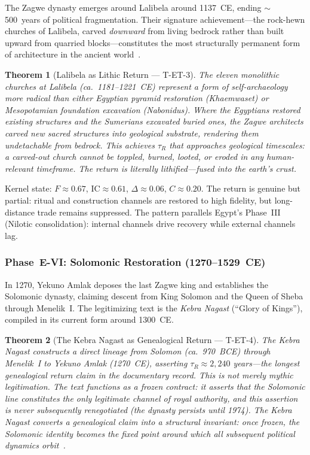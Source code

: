 \documentclass[
  aps,
  prd,
  twocolumn,
  superscriptaddress,
  nofootinbib,
  floatfix
]{revtex4-2}
\newtheorem{theorem}{Theorem}
\newcommand{\tR}{\tau_{\!R}}
\newcommand{\IC}{\mathrm{IC}}
\begin{document}
The Zagwe dynasty emerges around Lalibela around
1137~CE, ending $\sim$500~years of political
fragmentation.  Their signature achievement---the
rock-hewn churches of Lalibela, carved \emph{downward}
from living bedrock rather than built upward from
quarried blocks---constitutes the most structurally
permanent form of architecture in the ancient
world~\cite{phillipson2012aksum}.

\begin{theorem}[Lalibela as Lithic Return ---
T-ET-3]\label{thm:lalibela}
The eleven monolithic churches at Lalibela
(ca.\ 1181--1221~CE) represent a form of
self-archaeology more radical than either Egyptian
pyramid restoration (Khaemwaset) or Mesopotamian
foundation excavation (Nabonidus).  Where the
Egyptians \emph{restored} existing structures and
the Sumerians \emph{excavated} buried ones, the
Zagwe architects carved new sacred structures
\emph{into} geological substrate, rendering them
undetachable from bedrock.  This achieves $\tR$
that approaches geological timescales: a carved-out
church cannot be toppled, burned, looted, or eroded
in any human-relevant timeframe.  The return is
literally lithified---fused into the earth's crust.
\end{theorem}

Kernel state: $F \approx 0.67$, $\IC \approx 0.61$,
$\Delta \approx 0.06$, $C \approx 0.20$.  The
return is genuine but partial: ritual and
construction channels are restored to high fidelity,
but long-distance trade remains suppressed.  The
pattern parallels Egypt's Phase~III (Nilotic
consolidation): internal channels drive recovery
while external channels lag.

\subsubsection{Phase~E-VI: Solomonic
Restoration
(1270--1529~CE)}\label{sec:solomonic}

In 1270, Yekuno Amlak deposes the last Zagwe king
and establishes the Solomonic dynasty, claiming
descent from King Solomon and the Queen of Sheba
through Menelik~I.  The legitimizing text is the
\emph{Kebra Nagast} (``Glory of Kings''), compiled
in its current form around 1300~CE.

\begin{theorem}[The Kebra Nagast as Genealogical
Return --- T-ET-4]\label{thm:kebra}
The \emph{Kebra Nagast} constructs a direct lineage
from Solomon (ca.\ 970~BCE) through Menelik~I to
Yekuno Amlak (1270~CE), asserting $\tR \approx
2{,}240$ years---the longest genealogical return
claim in the documentary record.  This is not
merely mythic legitimation.  The text functions as
a \emph{frozen contract}: it asserts that the
Solomonic line constitutes the only legitimate
channel of royal authority, and this assertion is
never subsequently renegotiated (the dynasty
persists until 1974).  The Kebra Nagast converts
a genealogical claim into a structural invariant:
once frozen, the Solomonic identity becomes the
fixed point around which all subsequent political
dynamics orbit~\cite{budge1922kebra}.
\end{theorem}
\end{document}
